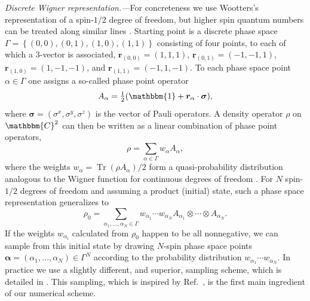 \documentclass[aps,prl,showpacs,amsmath,amssymb,superscriptaddress,reprint,10pt]{revtex4-1}
\newcommand\CC{{\mathbbm{C}}}
\newcommand\id{{\mathbbm{1}}}
\newcommand{\mvec}[1]{\boldsymbol #1}
\DeclareMathOperator{\Tr}{{Tr}}
\begin{document}
{\em Discrete Wigner representation.---}For concreteness we use Wootters's representation of a spin-$1/2$ degree of freedom, but higher spin quantum numbers can be treated along similar lines \cite{Wootters87}. Starting point is a discrete phase space $\Gamma=\left\{(0,0),(0,1),(1,0),(1,1)\right\}$ consisting of four points, to each of which a 3-vector is associated, $\mvec{r}_{(0,0)}=(1,1,1)$, $\mvec{r}_{(0,1)}=(-1,-1,1)$, $\mvec{r}_{(1,0)}=(1,-1,-1)$, and $\mvec{r}_{(1,1)}=(-1,1,-1)$. To each phase space point $\alpha\in\Gamma$ one assigns a so-called phase point operator
\begin{equation}\label{e:Aalpha}
A_\alpha = \tfrac{1}{2}(\id+\mvec{r}_\alpha\cdot\mvec{\sigma}),
\end{equation}
where $\mvec{\sigma}=\left(\sigma^x,\sigma^y,\sigma^z\right)$ is the vector of Pauli operators. A density operator $\rho$ on $\CC^2$ can then be written  as a linear combination of phase point operators,
\begin{equation}
\rho=\sum_{\alpha\in\Gamma}w_\alpha A_\alpha,
\end{equation}
where the weights $w_\alpha=\Tr(\rho A_\alpha)/2$ form a quasi-probability distribution analogous to the Wigner function for continuous degrees of freedom \cite{Wootters87}. For $N$ spin-$1/2$ degrees of freedom and assuming a product (initial) state, such a phase space representation generalizes to
\begin{equation}
\rho_0=\sum_{\alpha_1,\dotsc,\alpha_N\in\Gamma}w_{\alpha_1}\cdots w_{\alpha_N}A_{\alpha_1}\otimes\cdots\otimes A_{\alpha_N}.
\end{equation}
If the weights $w_{\alpha_i}$ calculated from $\rho_0$ happen to be all nonnegative, we can sample from this initial state by drawing $N$-spin phase space points $\mvec{\alpha}=(\alpha_1,\dotsc,\alpha_N)\in\Gamma^N$ according to the probability distribution $w_{\alpha_1}\cdots w_{\alpha_N}$. In practice we use a slightly different, and superior, sampling scheme, which is detailed in \cite{Note1}. This sampling, which is inspired by Ref.~\cite{Schachenmayer_etal15}, is the first main ingredient of our numerical scheme.
\end{document}
